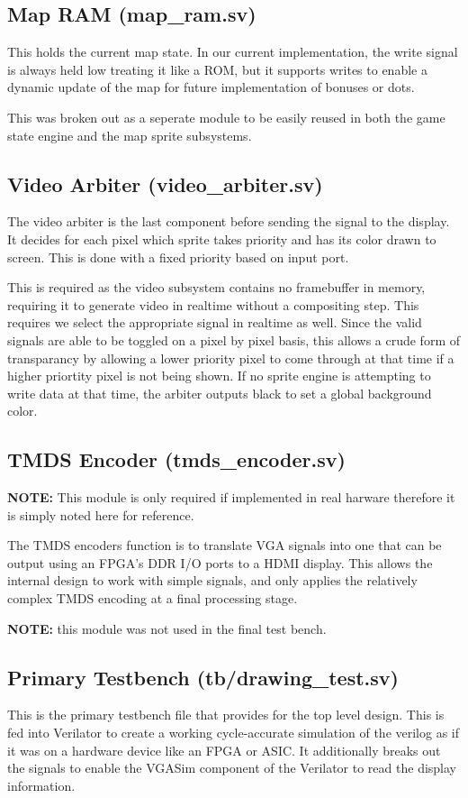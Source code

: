 \documentclass[12pt]{article}
\begin{document}
\subsection{Map RAM (map\_ram.sv)}
This holds the current map state. In our current implementation, the write signal
is always held low treating it like a ROM, but it supports writes to enable a
dynamic update of the map for future implementation of bonuses or dots.

This was broken out as a seperate module to be easily reused in both the game
state engine and the map sprite subsystems.

\subsection{Video Arbiter (video\_arbiter.sv)}
The video arbiter is the last component before sending the signal to the
display. It decides for each pixel which sprite takes priority and has its color
drawn to screen. This is done with a fixed priority based on input port.

This is required as the video subsystem contains no framebuffer in memory,
requiring it to generate video in realtime without a compositing step. This
requires we select the appropriate signal in realtime as well. Since the valid
signals are able to be toggled on a pixel by pixel basis, this allows a crude
form of transparancy by allowing a lower priority pixel to come through at that
time if a higher priortity pixel is not being shown. If no sprite engine is
attempting to write data at that time, the arbiter outputs black to set a global
background color.

\subsection{TMDS Encoder (tmds\_encoder.sv)}
\textbf{NOTE:} This module is only required if implemented in real harware
therefore it is simply noted here for reference.

The TMDS encoders function is to translate VGA signals into one that can be
output using an FPGA's DDR I/O ports to a HDMI display. This allows the internal
design to work with simple signals, and only applies the relatively complex TMDS
encoding at a final processing stage.

\textbf{NOTE:} this module was not used in the final test bench.

\subsection{Primary Testbench (tb/drawing\_test.sv)}
This is the primary testbench file that provides for the top level design. This
is fed into Verilator to create a working cycle-accurate simulation of the verilog as if it
was on a hardware device like an FPGA or ASIC. It additionally breaks out the
signals to enable the VGASim component of the Verilator to read the display information.
\end{document}
